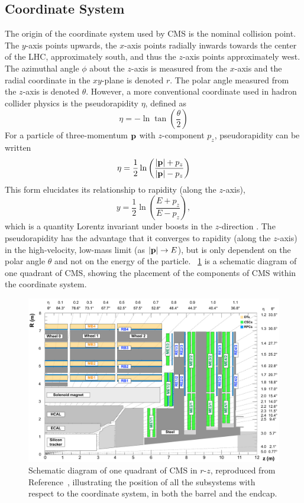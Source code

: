 \subsection{Coordinate System}
The origin of the coordinate system used by CMS is the nominal \pp collision point.
The $y$-axis points upwards, the $x$-axis points radially inwards towards the center of the LHC, approximately south, and thus the $z$-axis points approximately west.
The azimuthal angle $\phi$ about the $z$-axis is measured from the $x$-axis and the radial coordinate in the $xy$-plane is denoted $r$.
The polar angle measured from the $z$-axis is denoted $\theta$.
However, a more conventional coordinate used in hadron collider physics is the pseudorapidity $\eta$, defined as
\begin{equation}
  \eta = -\ln\tan\left(\frac{\theta}{2}\right)
  \label{eq:eta}
\end{equation}
For a particle of three-momentum $\mathbf{p}$ with $z$-component $p_z$, pseudorapidity can be written
\begin{equation}
  \eta = \frac12\ln\left(\frac{|\mathbf{p}|+p_z}{|\mathbf{p}|-p_z}\right)
  \label{eq:eta_p}
\end{equation}
This form elucidates its relationship to rapidity (along the $z$-axis),
\begin{equation}
  y = \frac12\ln\left(\frac{E+p_z}{E-p_z}\right),
  \label{eq:rap}
\end{equation}
which is a quantity Lorentz invariant under boosts in the $z$-direction \cite{Hama:1981}.
The pseudorapidity has the advantage that it converges to rapidity (along the $z$-axis) in the high-velocity, low-mass limit (as $|\mathbf{p}|\to E$), but is only dependent on the polar angle $\theta$ and not on the energy of the particle.
\Fig~\ref{cms:quadrant} is a schematic diagram of one quadrant of CMS, showing the placement of the components of CMS within the coordinate system.
\begin{figure}[tpb]
  \centering
  \includegraphics[width=\textwidth]{figures/cms/CMSGeometry.pdf}
  \caption[Schematic diagram of one quadrant of CMS in $r$-$z$.]{Schematic diagram of one quadrant of CMS in $r$-$z$, reproduced from Reference~\cite{Sirunyan:2018fpa}, illustrating the position of all the subsystems with respect to the coordinate system, in both the barrel and the endcap.}
  \label{cms:quadrant}
\end{figure}

